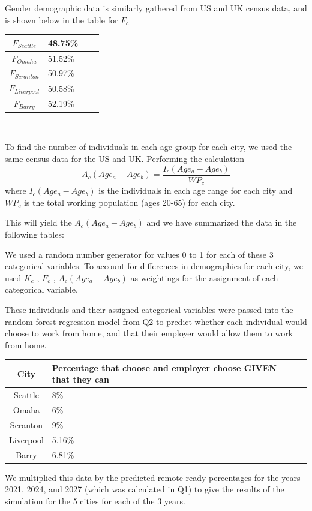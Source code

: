 \documentclass{article}
\begin{document}
Gender demographic data is similarly gathered from US and UK census data, and is shown below in the table for $F_c$
\begin{table}[ht]
\centering
\begin{tabularx}{37mm}{|c|X|c|X|}
\hline
    $F_{Seattle}$ & 48.75\% \\ \hline
    $F_{Omaha}$ & 51.52\% \\ \hline
    $F_{Scranton}$ & 50.97\% \\ \hline
    $F_{Liverpool}$ & 50.58\% \\ \hline
    $F_{Barry}$ & 52.19\% \\ \hline
\end{tabularx}
\end{table} \\ \indent

To find the number of individuals in each age group for each city, we used the same census data for the US and UK. Performing the calculation
\[
A_c(Age_a-Age_b) = \frac{I_c(Age_a-Age_b)}{WP_c}
\]
where $I_c(Age_a-Age_b)$ is the individuals in each age range for each city and $WP_c$ is the total working population (ages 20-65) for each city. 


This will yield the $A_c(Age_a-Age_b)$ and we have summarized the data in the following tables:






We used a random number generator for values 0 to 1 for each of these 3 categorical variables. To account for differences in demographics for each city, we used $K_c$ , $F_c$ , $A_c(Age_a-Age_b)$ as weightings for the assignment of each categorical variable. 

These individuals and their assigned categorical variables were passed into the random forest regression model from Q2 to predict whether each individual would choose to work from home, and that their employer would allow them to work from home. 
\begin{table}[ht]
\centering
\begin{tabularx}{\linewidth}{|c|X|c|X|}
\hline
    \textbf{City} & Percentage that choose and employer choose GIVEN that they can \\ \hline
    Seattle & 8\% \\ \hline
    Omaha & 6\% \\ \hline
    Scranton & 9\% \\ \hline
    Liverpool & 5.16\% \\ \hline
    Barry & 6.81\% \\ \hline
\end{tabularx}
\end{table}
We multiplied this data by the predicted remote ready percentages for the years 2021, 2024, and 2027 (which was calculated in Q1) to give the results of the simulation for the 5 cities for each of the 3 years.
\end{document}
